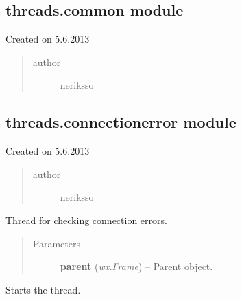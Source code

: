 \documentclass[letterpaper,10pt,english]{sphinxmanual}
\begin{document}
\subsection{threads.common module}
\label{threads:module-threads.common}\label{threads:threads-common-module}
Created on 5.6.2013
\begin{quote}\begin{description}
\item[{author}] \leavevmode
neriksso

\end{description}\end{quote}


\subsection{threads.connectionerror module}
\label{threads:threads-connectionerror-module}\label{threads:module-threads.connectionerror}
Created on 5.6.2013
\begin{quote}\begin{description}
\item[{author}] \leavevmode
neriksso

\end{description}\end{quote}

\begin{fulllineitems}
\label{threads:threads.connectionerror.CONNECTION_ERROR_THREAD}
Thread for checking connection errors.
\begin{quote}\begin{description}
\item[{Parameters}] \leavevmode
\textbf{parent} (\emph{wx.Frame}) -- Parent object.

\end{description}\end{quote}

\begin{fulllineitems}
\label{threads:threads.connectionerror.CONNECTION_ERROR_THREAD.run}
Starts the thread.

\end{fulllineitems}


\end{fulllineitems}
\end{document}
